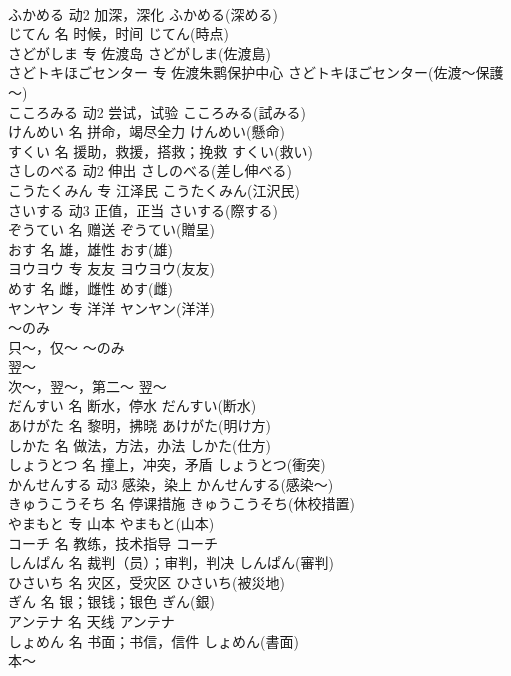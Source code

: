 \documentclass[8pt]{extreport}
\begin{document}
\begin{CJK}{UTF8}{min}
\\	ふかめる	动2	加深，深化	ふかめる(深める)	
\\	じてん	名	时候，时间	じてん(時点)	
\\	さどがしま	专	佐渡岛	さどがしま(佐渡島)	
\\	さどトキほごセンター	专	佐渡朱鹮保护中心	さどトキほごセンター(佐渡～保護～)	
\\	こころみる	动2	尝试，试验	こころみる(試みる)	
\\	けんめい	名	拼命，竭尽全力	けんめい(懸命)	
\\	すくい	名	援助，救援，搭救；挽救	すくい(救い)	
\\	さしのべる	动2	伸出	さしのべる(差し伸べる)	
\\	こうたくみん	专	江泽民	こうたくみん(江沢民)	
\\	さいする	动3	正值，正当	さいする(際する)	
\\	ぞうてい	名	赠送	ぞうてい(贈呈)	
\\	おす	名	雄，雄性	おす(雄)	
\\	ヨウヨウ	专	友友	ヨウヨウ(友友)	
\\	めす	名	雌，雌性	めす(雌)	
\\	ヤンヤン	专	洋洋	ヤンヤン(洋洋)	
\\	～のみ	
\\	只～，仅～	～のみ	
\\	翌～	
\\	次～，翌～，第二～	翌～	
\\	だんすい	名	断水，停水	だんすい(断水)	
\\	あけがた	名	黎明，拂晓	あけがた(明け方)	
\\	しかた	名	做法，方法，办法	しかた(仕方)	
\\	しょうとつ	名	撞上，冲突，矛盾	しょうとつ(衝突)	
\\	かんせんする	动3	感染，染上	かんせんする(感染～)	
\\	きゅうこうそち	名	停课措施	きゅうこうそち(休校措置)	
\\	やまもと	专	山本	やまもと(山本)	
\\	コーチ	名	教练，技术指导	コーチ	
\\	しんぱん	名	裁判（员）；审判，判决	しんぱん(審判)	
\\	ひさいち	名	灾区，受灾区	ひさいち(被災地)	
\\	ぎん	名	银；银钱；银色	ぎん(銀)	
\\	アンテナ	名	天线	アンテナ	
\\	しょめん	名	书面；书信，信件	しょめん(書面)	
\\	本～	

\end{CJK}
\end{document}
